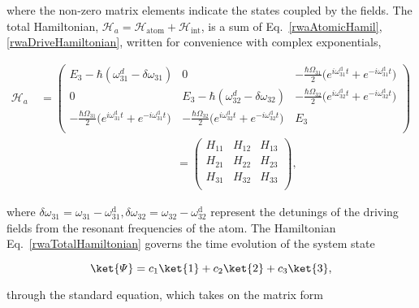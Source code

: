   \noindent where the non-zero matrix elements indicate the states coupled by the fields. The total Hamiltonian, $ \mathcal{H}_{a} = \mathcal{H}_{\text{atom}}+\mathcal{H}_{\text{int}}$, is a sum of Eq.~\eqref{rwaAtomicHamil}, \eqref{rwaDriveHamiltonian}, written for convenience with complex exponentials,
  
  {\small \begin{equation}
  	\begin{aligned}
  	\mathcal{H}_{a}\ & {= \begin{pmatrix}
  		E_3-\hbar(\omega_{31}^{d}-\delta\omega_{31}) & 0 & -\frac{\hbar\Omega_{31}}{2}\bigg(e^{i\omega^{\text{d}}_{31}t}+e^{-i\omega^{\text{d}}_{31}t}\bigg)  \\   	0 & E_3-\hbar(\omega_{32}^{d}-\delta\omega_{32})  & -\frac{\hbar\Omega_{32}}{2}\bigg(e^{i\omega^{\text{d}}_{32}t}+e^{-i\omega^{\text{d}}_{32}t}\bigg)  \\   	-\frac{\hbar\Omega_{31}}{2}\bigg(e^{i\omega^{\text{d}}_{31}t}+e^{-i\omega^{\text{d}}_{31}t}\bigg)  & -\frac{\hbar\Omega_{32}}{2}\bigg(e^{i\omega^{\text{d}}_{32}t}+e^{-i\omega^{\text{d}}_{32}t}\bigg) & E_3 \\
  		\end{pmatrix}}\\& \qquad\qquad\qquad\qquad\qquad\qquad = \begin{pmatrix}
  	H_{11} & H_{12} & H_{13} \\   	H_{21} & H_{22} & H_{23} \\   	H_{31} & H_{32} & H_{33} \\
  	\end{pmatrix},
  	\end{aligned}
  	\label{rwaTotalHamiltonian}
  	\end{equation}}
  
  \noindent where $  \delta\omega_{31} = \omega_{31} - \omega^{\text{d}}_{31}, \delta\omega_{32} = \omega_{32} - \omega^{\text{d}}_{32}$ represent the detunings of the driving fields from the resonant frequencies of the atom. The Hamiltonian Eq.~\eqref{rwaTotalHamiltonian} governs the time evolution of the system state 
  
  \begin{equation}
  \ket{\varPsi} = c_1\ket{1}+c_2\ket{2}+c_3\ket{3},
  \end{equation} 
  
  \noindent through the standard \schrodinger equation, which takes on the matrix form
  
